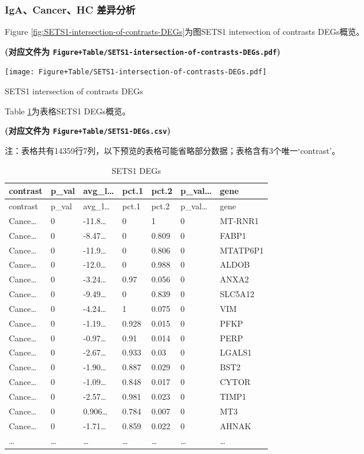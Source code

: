 \documentclass[
]{article}
\begin{document}
\hypertarget{igacancerhc-ux5deeux5f02ux5206ux6790}{%
\subsubsection{IgA、Cancer、HC 差异分析}\label{igacancerhc-ux5deeux5f02ux5206ux6790}}

Figure \ref{fig:SETS1-intersection-of-contrasts-DEGs}为图SETS1 intersection of contrasts DEGs概览。

\textbf{(对应文件为 \texttt{Figure+Table/SETS1-intersection-of-contrasts-DEGs.pdf})}

\def\@captype{figure}
\begin{center}
\texttt{[image: Figure+Table/SETS1-intersection-of-contrasts-DEGs.pdf]}
\caption{SETS1 intersection of contrasts DEGs}\label{fig:SETS1-intersection-of-contrasts-DEGs}
\end{center}

Table \ref{tab:SETS1-DEGs}为表格SETS1 DEGs概览。

\textbf{(对应文件为 \texttt{Figure+Table/SETS1-DEGs.csv})}

\begin{center}\begin{tcolorbox}[colback=gray!10, colframe=gray!50, width=0.9\linewidth, arc=1mm, boxrule=0.5pt]注：表格共有14359行7列，以下预览的表格可能省略部分数据；表格含有3个唯一`contrast'。
\end{tcolorbox}
\end{center}

\begin{longtable}[]{@{}lllllll@{}}
\caption{\label{tab:SETS1-DEGs}SETS1 DEGs}\tabularnewline
\toprule
contrast & p\_val & avg\_l\ldots{} & pct.1 & pct.2 & p\_val\ldots{} & gene\tabularnewline
\midrule
\endfirsthead
\toprule
contrast & p\_val & avg\_l\ldots{} & pct.1 & pct.2 & p\_val\ldots{} & gene\tabularnewline
\midrule
\endhead
Cance\ldots{} & 0 & -11.8\ldots{} & 0 & 1 & 0 & MT-RNR1\tabularnewline
Cance\ldots{} & 0 & -8.47\ldots{} & 0 & 0.809 & 0 & FABP1\tabularnewline
Cance\ldots{} & 0 & -11.9\ldots{} & 0 & 0.806 & 0 & MTATP6P1\tabularnewline
Cance\ldots{} & 0 & -12.0\ldots{} & 0 & 0.988 & 0 & ALDOB\tabularnewline
Cance\ldots{} & 0 & -3.24\ldots{} & 0.97 & 0.056 & 0 & ANXA2\tabularnewline
Cance\ldots{} & 0 & -9.49\ldots{} & 0 & 0.839 & 0 & SLC5A12\tabularnewline
Cance\ldots{} & 0 & -4.24\ldots{} & 1 & 0.075 & 0 & VIM\tabularnewline
Cance\ldots{} & 0 & -1.19\ldots{} & 0.928 & 0.015 & 0 & PFKP\tabularnewline
Cance\ldots{} & 0 & -0.97\ldots{} & 0.91 & 0.014 & 0 & PERP\tabularnewline
Cance\ldots{} & 0 & -2.67\ldots{} & 0.933 & 0.03 & 0 & LGALS1\tabularnewline
Cance\ldots{} & 0 & -1.90\ldots{} & 0.887 & 0.029 & 0 & BST2\tabularnewline
Cance\ldots{} & 0 & -1.09\ldots{} & 0.848 & 0.017 & 0 & CYTOR\tabularnewline
Cance\ldots{} & 0 & -2.57\ldots{} & 0.981 & 0.023 & 0 & TIMP1\tabularnewline
Cance\ldots{} & 0 & 0.906\ldots{} & 0.784 & 0.007 & 0 & MT3\tabularnewline
Cance\ldots{} & 0 & -1.71\ldots{} & 0.859 & 0.022 & 0 & AHNAK\tabularnewline
\ldots{} & \ldots{} & \ldots{} & \ldots{} & \ldots{} & \ldots{} & \ldots{}\tabularnewline
\bottomrule
\end{longtable}
\end{document}
